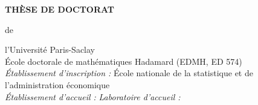 \documentclass[a4paper,12pt]{book}
\begin{document}
\begin{center}
{\Large\bf TH\`ESE DE DOCTORAT}
\end{center}
\begin{center}
{de }
\end{center}
\begin{center}
 {\Large\sc l'Universit\'e Paris-Saclay}\\
  \vspace*{0.4cm}
\'Ecole doctorale de math\'ematiques Hadamard (EDMH, ED 574)\\  
 \vspace*{0.4cm} 
{\small \it \'Etablissement d'inscription : } 
    \'Ecole nationale de la statistique et de l'administration \'economique\\
 \vspace*{0.2cm} 
{\small \it \'Etablissement d'accueil : }    
\vspace*{0.2cm} 
{\small \it Laboratoire d'accueil : }     

\end{center}
\end{document}
